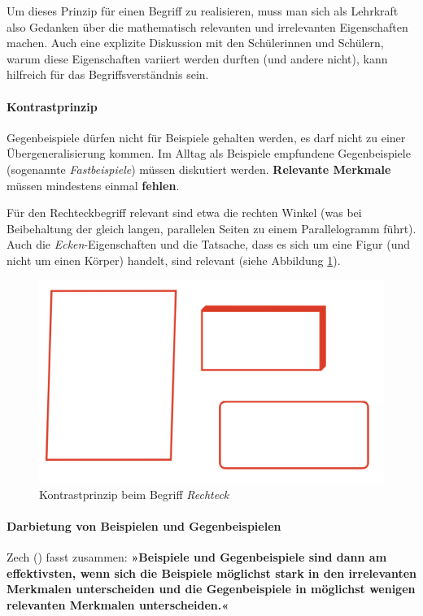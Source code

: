 \documentclass[
]{scrbook}
\theoremstyle{definition}
\theoremstyle{definition}
\theoremstyle{definition}
\theoremstyle{definition}
\theoremstyle{remark}
\begin{document}
Um dieses Prinzip für einen Begriff zu realisieren, muss man sich als Lehrkraft also Gedanken über die mathematisch relevanten und irrelevanten Eigenschaften machen. Auch eine explizite Diskussion mit den Schülerinnen und Schülern, warum diese Eigenschaften variiert werden durften (und andere nicht), kann hilfreich für das Begriffsverständnis sein.

\paragraph{Kontrastprinzip}\label{kontrastprinzip}

Gegenbeispiele dürfen nicht für Beispiele gehalten werden, es darf nicht zu einer Übergeneralisierung kommen. Im Alltag als Beispiele empfundene Gegenbeispiele (sogenannte \emph{Fastbeispiele}) müssen diskutiert werden. \textbf{Relevante Merkmale} müssen mindestens einmal \textbf{fehlen}.

Für den Rechteckbegriff relevant sind etwa die rechten Winkel (was bei Beibehaltung der gleich langen, parallelen Seiten zu einem Parallelogramm führt). Auch die \emph{Ecken}-Eigenschaften und die Tatsache, dass es sich um eine Figur (und nicht um einen Körper) handelt, sind relevant (siehe Abbildung \ref{fig:KontrasRechteck}).



\begin{figure}

{\centering \includegraphics[width=0.5\linewidth]{pictures/7-Kontrast} 

}

\caption{Kontrastprinzip beim Begriff \emph{Rechteck}}\label{fig:KontrasRechteck}
\end{figure}

\paragraph{Darbietung von Beispielen und Gegenbeispielen}\label{darbietung-von-beispielen-und-gegenbeispielen}

Zech () fasst zusammen: \textbf{»Beispiele und Gegenbeispiele sind dann am effektivsten, wenn sich die Beispiele möglichst stark in den irrelevanten Merkmalen unterscheiden und die Gegenbeispiele in möglichst wenigen relevanten Merkmalen unterscheiden.«}
\end{document}
